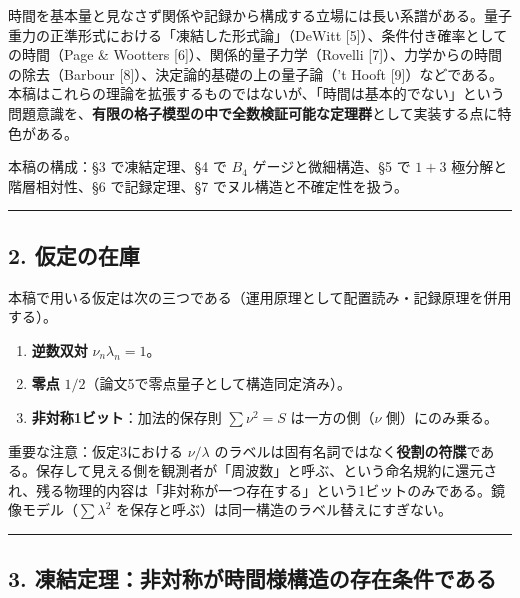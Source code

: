 \documentclass[
]{ltjsarticle}
\providecommand{\tightlist}{%
  \setlength{\itemsep}{0pt}\setlength{\parskip}{0pt}}
\begin{document}
時間を基本量と見なさず関係や記録から構成する立場には長い系譜がある。量子重力の正準形式における「凍結した形式論」（DeWitt
{[}5{]}）、条件付き確率としての時間（Page \& Wootters
{[}6{]}）、関係的量子力学（Rovelli
{[}7{]}）、力学からの時間の除去（Barbour
{[}8{]}）、決定論的基礎の上の量子論（'t Hooft
{[}9{]}）などである。本稿はこれらの理論を拡張するものではないが、「時間は基本的でない」という問題意識を、\textbf{有限の格子模型の中で全数検証可能な定理群}として実装する点に特色がある。

本稿の構成：§3 で凍結定理、§4 で \(B_4\) ゲージと微細構造、§5 で
\(1{+}3\) 極分解と階層相対性、§6 で記録定理、§7
でヌル構造と不確定性を扱う。

\begin{center}\rule{0.5\linewidth}{0.5pt}\end{center}

\subsection{2. 仮定の在庫}\label{ux4eeeux5b9aux306eux5728ux5eab}

本稿で用いる仮定は次の三つである（運用原理として配置読み・記録原理を併用する）。

\begin{enumerate}
\def\labelenumi{\arabic{enumi}.}
\tightlist
\item
  \textbf{逆数双対} \(\nu_n\lambda_n=1\)。
\item
  \textbf{零点} \(1/2\)（論文5で零点量子として構造同定済み）。
\item
  \textbf{非対称1ビット}：加法的保存則 \(\sum\nu^2=S\)
  は一方の側（\(\nu\) 側）にのみ乗る。
\end{enumerate}

重要な注意：仮定3における \(\nu/\lambda\)
のラベルは固有名詞ではなく\textbf{役割の符牒}である。保存して見える側を観測者が「周波数」と呼ぶ、という命名規約に還元され、残る物理的内容は「非対称が一つ存在する」という1ビットのみである。鏡像モデル（\(\sum\lambda^2\)
を保存と呼ぶ）は同一構造のラベル替えにすぎない。

\begin{center}\rule{0.5\linewidth}{0.5pt}\end{center}

\subsection{3.
凍結定理：非対称が時間様構造の存在条件である}\label{ux51cdux7d50ux5b9aux7406ux975eux5bfeux79f0ux304cux6642ux9593ux69d8ux69cbux9020ux306eux5b58ux5728ux6761ux4ef6ux3067ux3042ux308b}
\end{document}
